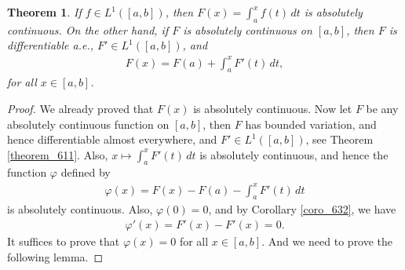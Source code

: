 \documentclass[11pt]{book}
\newtheorem{theorem}{Theorem}[chapter]
\theoremstyle{definition}
\numberwithin{equation}{chapter}
\begin{document}
\begin{theorem}
If $f \in L^1([a,b])$, then $F(x) = \int^x_a f(t)\,dt$ is absolutely continuous. On the other hand, if $F$ is absolutely continuous on $[a,b]$, then $F$ is differentiable a.e., $F' \in L^1([a,b])$, and 
\begin{align*}
    F(x) = F(a) + \int^x_a F'(t)\,dt,
\end{align*}
for all $x \in [a,b]$.
\end{theorem}
\begin{proof}
We already proved that $F(x)$ is absolutely continuous. Now let $F$ be any absolutely continuous function on $[a,b]$, then $F$ has bounded variation, and hence differentiable almost everywhere, and $F' \in L^1([a,b])$, see Theorem \ref{theorem_611}. Also, $x \mapsto \int^x_a F'(t)\,dt$ is absolutely continuous, and hence the function $\varphi$ defined by
\begin{align*}
    \varphi(x) = F(x) - F(a) - \int^x_a F'(t)\,dt
\end{align*}
is absolutely continuous. Also, $\varphi(0) = 0$, and by Corollary \ref{coro_632}, we have
\begin{align*}
    \varphi'(x) = F'(x) - F'(x)  = 0.
\end{align*}
It suffices to prove that $\varphi(x) = 0$ for all $x \in [a,b]$. And we need to prove the following lemma.

\medskip


\end{proof}
\end{document}
